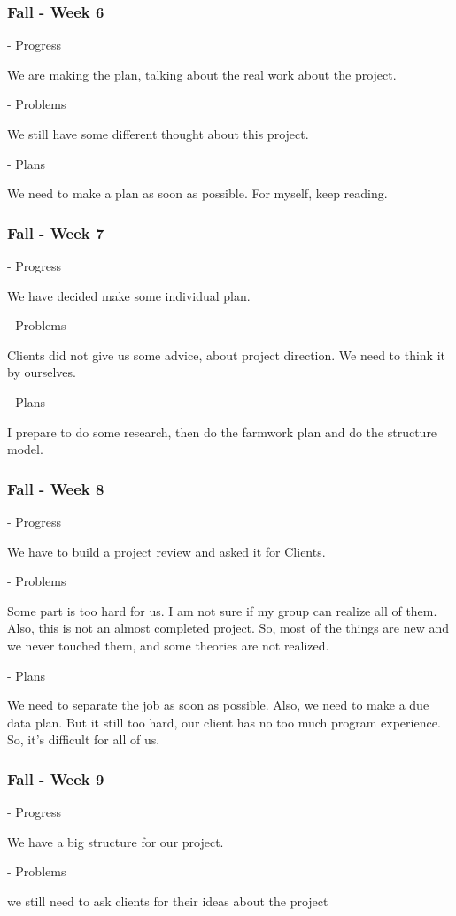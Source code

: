 \documentclass[onecolumn, draftclsnofoot,10pt, compsoc]{IEEEtran}
\begin{document}
\subsubsection{Fall - Week 6}
- Progress

We are making the plan, talking about the real work about the project.

- Problems

We still have some different thought about this project.

- Plans

We need to make a plan as soon as possible.
For myself, keep reading.
\subsubsection{Fall - Week 7}
- Progress

We have decided make some individual plan.

- Problems

Clients did not give us some advice, about project direction.
We need to think it by ourselves.

- Plans

I prepare to do some research, then do the farmwork plan and do the structure model.
\subsubsection{Fall - Week 8}
- Progress

We have to build a project review and asked it for Clients.

- Problems

Some part is too hard for us.
I am not sure if my group can realize all of them.
Also, this is not an almost completed project.
So, most of the things are new and we never touched them, and some theories are not realized.

- Plans

We need to separate the job as soon as possible.
Also, we need to make a due data plan.
But it still too hard, our client has no too much program experience.
So, it's difficult for all of us.
\subsubsection{Fall - Week 9}
- Progress

We have a big structure for our project.

- Problems

we still need to ask clients for their ideas about the project
\end{document}
